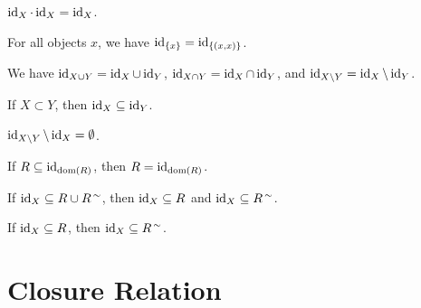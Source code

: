 \documentclass{article}
\begin{document}
\begin{thm}
\item\label{sysrel:12} $\operatorname{id}_{X}\cdot\operatorname{id}_{X}=\operatorname{id}_{X}$.
\item\label{sysrel:13} For all objects $x$, we have $\operatorname{id}_{\{x\}}=\operatorname{id}_{\{(x,x)\}}$.
\item\label{sysrel:14} We have $\operatorname{id}_{X\cup Y}=\operatorname{id}_{X}\cup\operatorname{id}_{Y}$,
  $\operatorname{id}_{X\cap Y}=\operatorname{id}_{X}\cap\operatorname{id}_{Y}$, and $\operatorname{id}_{X\setminus Y}=\operatorname{id}_{X}\setminus\operatorname{id}_{Y}$.
\item\label{sysrel:15} If $X\subset Y$, then $\operatorname{id}_{X}\subseteq\operatorname{id}_{Y}$.
\item\label{sysrel:16} $\operatorname{id}_{X\setminus Y}\setminus\operatorname{id}_{X}=\emptyset$.
\item\label{sysrel:17} If $R\subseteq\operatorname{id}_{\operatorname{dom}(R)}$, then $R=\operatorname{id}_{\operatorname{dom}(R)}$.
\item\label{sysrel:18} If $\operatorname{id}_{X}\subseteq R\cup R^{\,\sim}$,
  then $\operatorname{id}_{X}\subseteq R$ and $\operatorname{id}_{X}\subseteq R^{\,\sim}$.
\item\label{sysrel:19} If $\operatorname{id}_{X}\subseteq R$, then $\operatorname{id}_{X}\subseteq R^{\,\sim}$.
\end{thm}

\section{Closure Relation}
\end{document}
